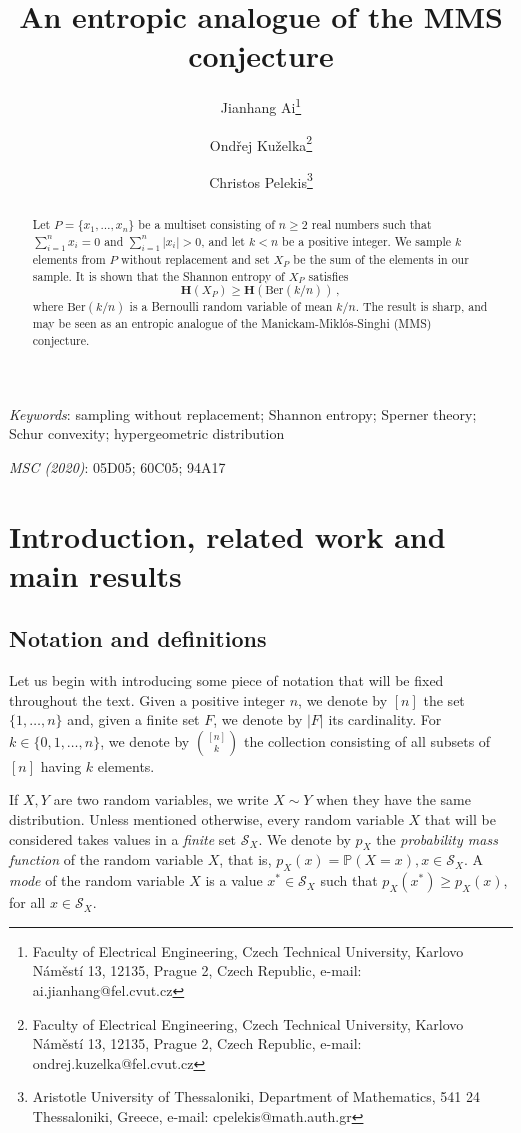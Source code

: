 \documentclass[11pt]{article}
\title{An entropic analogue of the MMS conjecture}
\author{
Jianhang Ai\thanks{Faculty of Electrical Engineering, Czech Technical University, Karlovo N\'am\v{e}st\'i 13, 12135, Prague 2, Czech Republic, e-mail: ai.jianhang@fel.cvut.cz}
\and
Ond\v{r}ej Ku\v{z}elka\thanks{Faculty of Electrical Engineering, Czech Technical University, Karlovo N\'am\v{e}st\'i 13, 12135, Prague 2, Czech Republic, e-mail: ondrej.kuzelka@fel.cvut.cz}
\and
Christos Pelekis\thanks{Aristotle University of Thessaloniki, 
Department of Mathematics, 
541 24 Thessaloniki, Greece, e-mail:  cpelekis@math.auth.gr }
}
\newcommand{\Prb}{\mathbb{P}}
\begin{document}
\maketitle



\begin{abstract}  
Let $P=\{x_1,\ldots,x_n\}$ be a multiset consisting of $n\ge 2$ real numbers such that $\sum_{i=1}^{n}x_i=0$ and $\sum_{i=1}^{n}|x_i|>0$, and let $k <n$ be a   positive integer. We sample $k$ elements from $P$ without replacement and set $X_P$ be the sum of the elements in our sample. 
It is shown  that the Shannon entropy of $X_P$ satisfies 
\[
\mathbf{H}(X_P) \ge \mathbf{H}(\text{Ber}(k/n)) \, ,
\]  
where $\text{Ber}(k/n)$ is a Bernoulli random variable of mean $k/n$.  
The result is sharp, and may be seen as an entropic analogue of the Manickam-Mikl\'os-Singhi (MMS) conjecture. 
\end{abstract}


\noindent
\emph{Keywords}:  sampling without replacement; Shannon entropy; Sperner theory; Schur convexity; hypergeometric distribution 
\vspace{0.2cm}

\noindent
\emph{MSC (2020)}: 05D05; 60C05; 94A17




\section{Introduction, related work and main results}

\subsection{Notation and definitions}

Let us begin with introducing some piece of notation that will be fixed throughout the text. 
Given a positive integer $n$, we denote by $[n]$ the set $\{1,\ldots,n\}$ and, given a finite set $F$, we denote by $|F|$ its cardinality. 
For $k\in \{0,1,\ldots,n\}$, we denote by $\binom{[n]}{k}$ the collection consisting of all subsets of $[n]$ having $k$ elements. 

If $X,Y$ are two random variables, we write $X\sim Y$ when they have the same distribution. 
Unless mentioned otherwise, every random variable $X$ that will be considered takes values in a \emph{finite} set $\mathcal{S}_X$. We  denote by $p_X$ the \emph{probability mass function} of the random variable $X$, that is,   $p_X(x) =\Prb(X=x), x\in\mathcal{S}_X$. 
A \emph{mode} of the random variable $X$ is a value $x^*\in\mathcal{S}_X$ such that $p_X(x^*)\ge p_X(x)$, for all $x\in\mathcal{S}_X$. 
\end{document}
